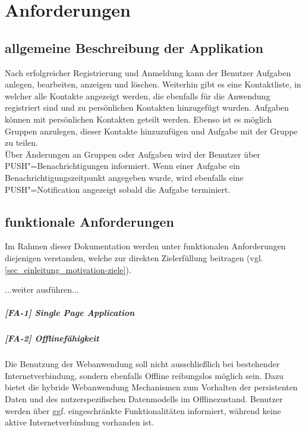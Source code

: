 \chapter{Anforderungen}
\section{allgemeine Beschreibung der Applikation}

Nach erfolgreicher Registrierung und Anmeldung kann der Benutzer Aufgaben anlegen, bearbeiten, anzeigen und löschen. Weiterhin gibt es eine Kontaktliste, in welcher alle Kontakte angezeigt werden, die ebenfalls für die Anwendung registriert sind und zu persönlichen Kontakten hinzugefügt wurden. Aufgaben können mit persönlichen Kontakten geteilt werden. Ebenso ist es möglich Gruppen anzulegen, dieser Kontakte hinzuzufügen und Aufgabe mit der Gruppe zu teilen. \\

Über Änderungen an Gruppen oder Aufgaben wird der Benutzer über PUSH"=Benachrichtigungen informiert. Wenn einer Aufgabe ein Benachrichtigungszeitpunkt angegeben wurde, wird ebenfalls eine PUSH"=Notification angezeigt sobald die Aufgabe terminiert.

\newpage
\section{funktionale Anforderungen}
\label{sec_anforderungen_funktionale-anforderungen}

Im Rahmen dieser Dokumentation werden unter funktionalen Anforderungen diejenigen verstanden, welche zur direkten Zielerfüllung beitragen (vgl. \ref{sec_einleitung_motivation-ziele}).

...weiter ausführen...

\paragraph{[FA-1] Single Page Application}\label{fa-1}
\paragraph{[FA-2] Offlinefähigkeit}\label{fa-2} Die Benutzung der Webanwendung soll nicht ausschließlich bei bestehender Internetverbindung, sondern ebenfalls Offline reibungslos möglich sein. Dazu bietet die hybride Webanwendung Mechanismen zum Vorhalten der persistenten Daten und des nutzerspezifischen Datenmodells im Offlinezustand. Benutzer werden über ggf. eingeschränkte Funktionalitäten informiert, während keine aktive Internetverbindung vorhanden ist.

